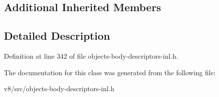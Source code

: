 \subsection*{Additional Inherited Members}


\subsection{Detailed Description}


Definition at line 342 of file objects-\/body-\/descriptors-\/inl.\+h.



The documentation for this class was generated from the following file\+:\begin{DoxyCompactItemize}
\item 
v8/src/objects-\/body-\/descriptors-\/inl.\+h\end{DoxyCompactItemize}
